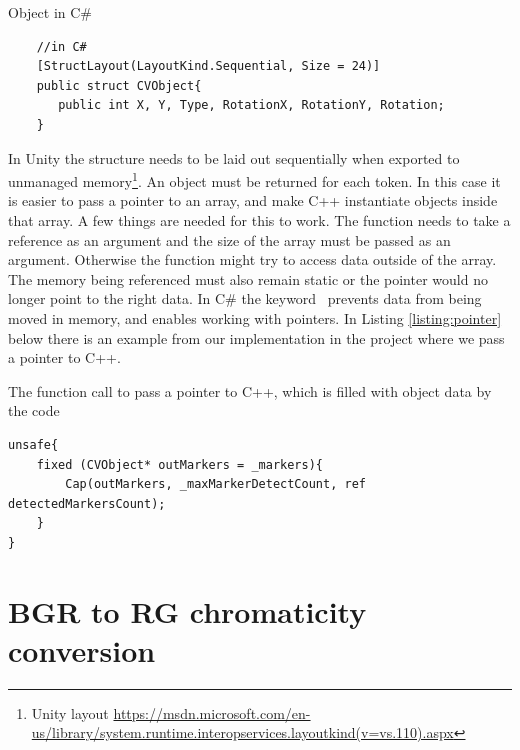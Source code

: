 \begin{listing}[H]
	\caption{Object in C\#}
	\label{listing:objects2}
	\begin{verbatim}
	//in C#	
	[StructLayout(LayoutKind.Sequential, Size = 24)]
	public struct CVObject{
	   public int X, Y, Type, RotationX, RotationY, Rotation;
	}
	\end{verbatim}
\end{listing}
In Unity the structure needs to be laid out sequentially when exported to unmanaged memory\footnote{Unity layout \url{https://msdn.microsoft.com/en-us/library/system.runtime.interopservices.layoutkind(v=vs.110).aspx}}.  An object must be returned for each token. In this case it is easier to pass a pointer to an array, and make C++ instantiate objects inside that array. A few things are needed for this to work. The function needs to take a reference as an argument and the size of the array must be passed as an argument. Otherwise the function might try to access data outside of the array. The memory being referenced must also remain static or the pointer would no longer point to the right data. In C\# the keyword  prevents data from being moved in memory, and  enables working with pointers. In Listing \ref{listing:pointer} below there is an example from our implementation in the project where we pass a pointer to C++. %
\begin{listing}[H]
\caption{The function call to pass a pointer to C++, which is filled with object data by the code}
\label{listing:pointer}
\begin{verbatim}
unsafe{
	fixed (CVObject* outMarkers = _markers){
		Cap(outMarkers, _maxMarkerDetectCount, ref detectedMarkersCount);
	}
}
\end{verbatim}
\end{listing}


\section{BGR to RG chromaticity conversion}

